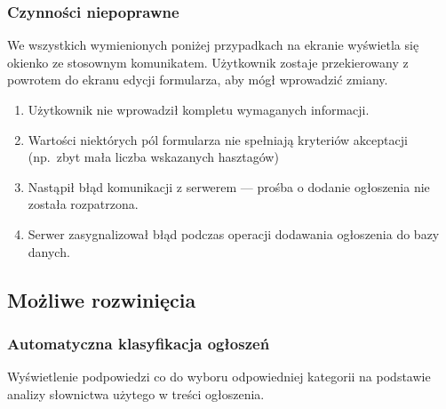\documentclass[licencjacka]{pracamgr}
\begin{document}
    \subsubsection{Czynności niepoprawne}
    We wszystkich wymienionych poniżej przypadkach na ekranie wyświetla się okienko ze stosownym komunikatem. Użytkownik zostaje przekierowany z powrotem do ekranu edycji formularza, aby mógł wprowadzić zmiany.
    \begin{enumerate}
        \item Użytkownik nie wprowadził kompletu wymaganych informacji.
        \item Wartości niektórych pól formularza nie spełniają kryteriów akceptacji (np.\ zbyt mała liczba wskazanych hasztagów)
        \item Nastąpił błąd komunikacji z serwerem --- prośba o dodanie ogłoszenia nie została rozpatrzona.
        \item Serwer zasygnalizował błąd podczas operacji dodawania ogłoszenia do bazy danych.
    \end{enumerate}
    \subsection{Możliwe rozwinięcia}
    \subsubsection{Automatyczna klasyfikacja ogłoszeń}
    Wyświetlenie podpowiedzi co do wyboru odpowiedniej kategorii na podstawie analizy słownictwa użytego w treści ogłoszenia.
\end{document}
